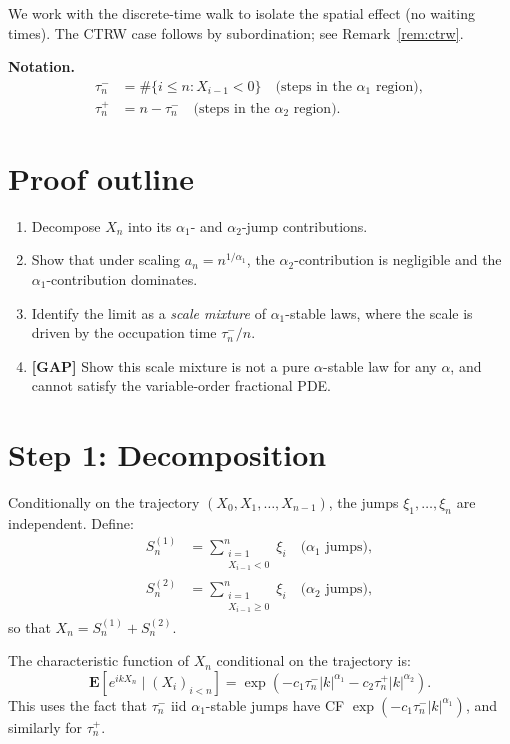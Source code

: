 \documentclass{amsart}
\theoremstyle{definition}
\begin{document}
We work with the discrete-time walk to isolate the spatial effect (no waiting times).
The CTRW case follows by subordination; see Remark~\ref{rem:ctrw}.

\textbf{Notation.}
\begin{align*}
    \tau_n^- &= \#\{i \leq n : X_{i-1} < 0\} \quad \text{(steps in the $\alpha_1$ region)}, \\
    \tau_n^+ &= n - \tau_n^- \quad \text{(steps in the $\alpha_2$ region)}.
\end{align*}

\section{Proof outline}

\begin{enumerate}
    \item Decompose $X_n$ into its $\alpha_1$- and $\alpha_2$-jump contributions.
    \item Show that under scaling $a_n = n^{1/\alpha_1}$, the $\alpha_2$-contribution
          is negligible and the $\alpha_1$-contribution dominates.
    \item Identify the limit as a \emph{scale mixture} of $\alpha_1$-stable laws,
          where the scale is driven by the occupation time $\tau_n^-/n$.
    \item \textbf{[GAP]} Show this scale mixture is not a pure $\alpha$-stable law
          for any $\alpha$, and cannot satisfy the variable-order fractional PDE.
\end{enumerate}

\section{Step 1: Decomposition}

Conditionally on the trajectory $(X_0, X_1, \ldots, X_{n-1})$, the jumps
$\xi_1, \ldots, \xi_n$ are independent. Define:
\begin{align*}
    S_n^{(1)} &= \sum_{\substack{i=1 \\ X_{i-1} < 0}}^n \xi_i
               \quad \text{($\alpha_1$ jumps)}, \\
    S_n^{(2)} &= \sum_{\substack{i=1 \\ X_{i-1} \geq 0}}^n \xi_i
               \quad \text{($\alpha_2$ jumps)},
\end{align*}
so that $X_n = S_n^{(1)} + S_n^{(2)}$.

The characteristic function of $X_n$ conditional on the trajectory is:
\begin{equation}
    \label{eq:conditional-cf}
    \mathbf{E}\!\left[e^{ik X_n} \;\Big|\; (X_i)_{i<n}\right]
    = \exp\!\left(-c_1 \tau_n^- |k|^{\alpha_1} - c_2 \tau_n^+ |k|^{\alpha_2}\right).
\end{equation}
This uses the fact that $\tau_n^-$ iid $\alpha_1$-stable jumps have CF
$\exp(-c_1 \tau_n^- |k|^{\alpha_1})$, and similarly for $\tau_n^+$.
\end{document}
